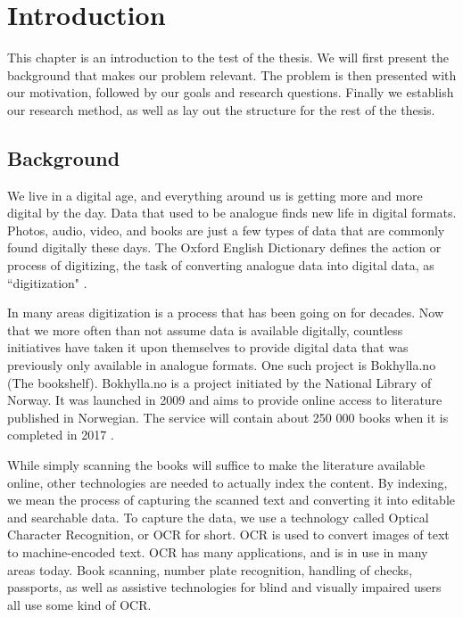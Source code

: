 
\chapter{Introduction}
\label{ch:introduction}
This chapter is an introduction to the test of the thesis. We will first present the background that makes our problem relevant. The problem is then presented with our motivation, followed by our goals and research questions. Finally we establish our research method, as well as lay out the structure for the rest of the thesis.


\section{Background}
We live in a digital age, and everything around us is getting more and more digital by the day. Data that used to be analogue finds new life in digital formats. Photos, audio, video, and books are just a few types of data that are commonly found digitally these days. The Oxford English Dictionary defines the action or process of digitizing, the task of converting analogue data into digital data, as ``digitization" \cite{misc-oed-digitization}.

In many areas digitization is a process that has been going on for decades. Now that we more often than not assume data is available digitally, countless initiatives have taken it upon themselves to provide digital data that was previously only available in analogue formats. One such project is Bokhylla.no (The bookshelf). Bokhylla.no is a project initiated by the National Library of Norway. It was launched in 2009 and aims to provide online access to literature published in Norwegian. The service will contain about 250 000 books when it is completed in 2017 \cite{misc-nb-digial-library}.

While simply scanning the books will suffice to make the literature available online, other technologies are needed to actually index the content. By indexing, we mean the process of capturing the scanned text and converting it into editable and searchable data. To capture the data, we use a technology called Optical Character Recognition, or OCR for short. OCR is used to convert images of text to machine-encoded text. OCR has many applications, and is in use in many areas today. Book scanning, number plate recognition, handling of checks, passports, as well as assistive technologies for blind and visually impaired users all use some kind of OCR.

